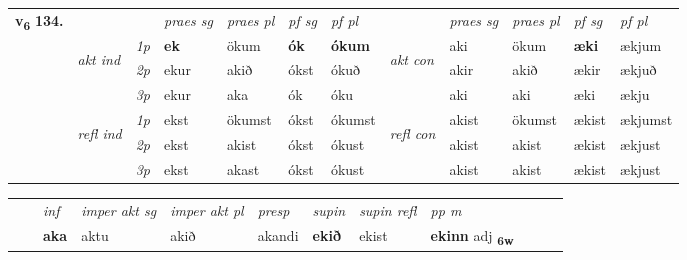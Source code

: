 \begin{tabular}{llllllllllll} \toprule
\multirow{4}{*}{{{\textbf{v{\textsubscript{6}}} \Large{\textbf{134.}}}}}  & &   &  \textit{praes sg}  & \textit{praes pl}  &\textit{ pf sg} & \textit{pf pl} &  &  \textit{praes sg}  & \textit{praes pl}  & \textit{pf sg} & \textit{pf pl } \\*
	\cmidrule{4-7} \cmidrule{9-12}
 & \multirow{3}{*}{\begin{turn}{90}\textit{akt ind}\end{turn}} & {\textit{1p}} & \textbf{ek} & ökum    & \textbf{ók} & \textbf{ókum} & \multirow{3}{*}{\begin{turn}{90}\textit{akt con}\end{turn}} &aki & ökum & \textbf{æki} & ækjum\\*
& &  {\textit{2p}} &  ekur  & akið   & ókst & ókuð & & akir & akið & ækir & ækjuð \\*
& &  {\textit{3p}} & ekur & aka   & ók & óku & & aki & aki& æki & ækju  \\*
\cmidrule{4-7} \cmidrule{9-12}
 &\multirow{3}{*}{\begin{turn}{90}\textit{refl ind}\end{turn}} & {\textit{1p}} & ekst & ökumst    & ókst & ókumst & \multirow{3}{*}{\begin{turn}{90}\textit{refl con}\end{turn}}  &akist & ökumst & ækist & ækjumst\\*
 &&  {\textit{2p}} &  ekst  & akist   & ókst & ókust & &akist & akist & ækist & ækjust \\*
& &  {\textit{3p}} & ekst & akast   & ókst & ókust & & akist & akist& ækist & ækjust  \\*
\cmidrule{4-7} \cmidrule{9-12}
\end{tabular}


\begin{tabular}{llllllllllll}
 & & \textit{inf} & \textit{imper akt sg} & \textit{imper akt pl}   & \textit{presp} & \textit{supin} & \textit{supin refl} & \textit{pp m}     \\*
  & & \textbf{aka} & aktu  & akið   & akandi &  \textbf{ekið} & ekist & \textbf{ekinn} adj \textbf{\textsubscript{6w}} \\*
\cmidrule{1-12}
\end{tabular}



